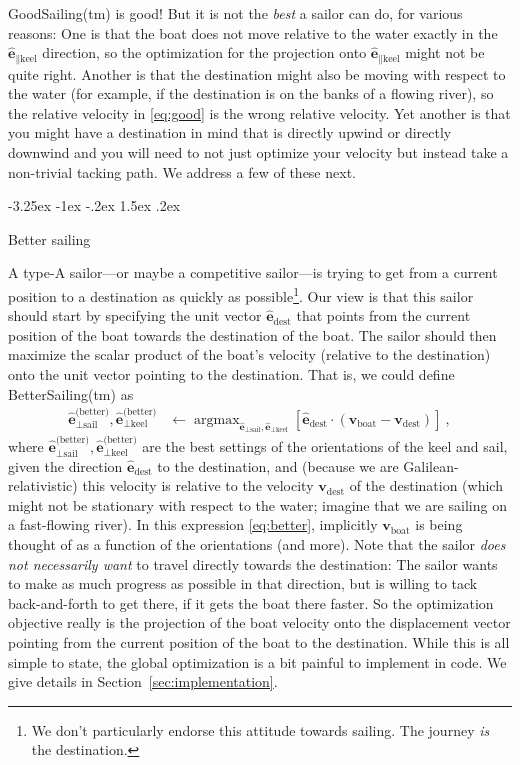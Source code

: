 \documentclass[letterpaper]{article}
\makeatletter
\DeclareMathOperator*{\argmax}{argmax}
\renewcommand{\vec}[1]{\boldsymbol{#1}}
\newcommand{\uvec}{\vec{\hat{e}}}
\newcommand{\boat}{\text{boat}}
\newcommand{\destination}{\text{dest}}
\newcommand{\better}{\text{(better)}}
\newcommand{\sail}{\text{sail}}
\newcommand{\keel}{\text{keel}}
\newcommand{\vboat}{\vec{v}_\boat}
\newcommand{\vdest}{\vec{v}_\destination}
\newcommand{\secref}[1]{Section~\ref{#1}}
\renewcommand\section{\@startsection {section}{1}{\z@}%
  {-3.25ex \@plus -1ex \@minus -.2ex}%
  {1.5ex \@plus .2ex}%
  {\raggedright\normalfont\large\bfseries}}
\makeatother
\begin{document}
GoodSailing(tm) is good!
But it is not the \emph{best} a sailor can do, for various reasons:
One is that the boat does not move relative to the water exactly in the $\uvec_{\parallel\keel}$ direction, so the optimization for the projection onto $\uvec_{\parallel\keel}$ might not be quite right.
Another is that the destination might also be moving with respect to the water (for example, if the destination is on the banks of a flowing river), so the relative velocity in \eqref{eq:good} is the wrong relative velocity.
Yet another is that you might have a destination in mind that is directly upwind or directly downwind and you will need to not just optimize your velocity but instead take a non-trivial tacking path.
We address a few of these next.

\section{Better sailing}\label{sec:better}

A type-A sailor---or maybe a competitive sailor---is trying to get from a current position to a destination as quickly as possible\footnote{%
We don't particularly endorse this attitude towards sailing. The journey \emph{is} the destination.}.
Our view is that this sailor should start by specifying the unit vector $\uvec_\destination$ that points from the current position of the boat towards the destination of the boat.
The sailor should then maximize the scalar product of the boat's velocity (relative to the destination) onto the unit vector pointing to the destination.
That is, we could define BetterSailing(tm) as
\begin{align}\label{eq:better}
    \uvec_{\perp\sail}^\better,\uvec_{\perp\keel}^\better &\leftarrow \argmax_{\uvec_{\perp\sail},\uvec_{\perp\keel}} \left[\uvec_\destination\cdot(\vboat-\vdest)\right] ~,
\end{align}
where $\uvec_{\perp\sail}^\better,\uvec_{\perp\keel}^\better$ are the best settings of the orientations of the keel and sail, given the direction $\uvec_\destination$ to the destination, and (because we are Galilean-relativistic) this velocity is relative to the velocity $\vdest$ of the destination (which might not be stationary with respect to the water; imagine that we are sailing on a fast-flowing river).
In this expression \eqref{eq:better}, implicitly $\vboat$ is being thought of as a function of the orientations (and more).
Note that the sailor \emph{does not necessarily want} to travel directly towards the destination:
The sailor wants to make as much progress as possible in that direction, but is willing to tack back-and-forth to get there, if it gets the boat there faster.
So the optimization objective really is the projection of the boat velocity onto the displacement vector pointing from the current position of the boat to the destination.
While this is all simple to state, the global optimization is a bit painful to implement in code.
We give details in \secref{sec:implementation}.
\end{document}

